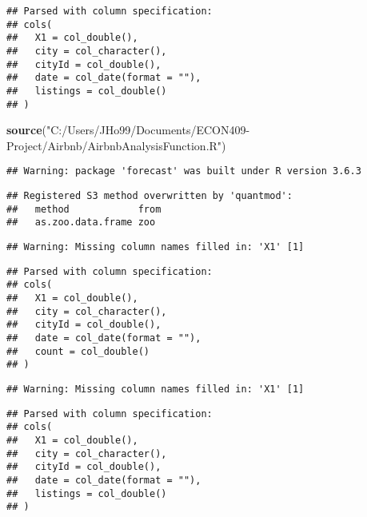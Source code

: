 \documentclass[
]{article}
\newenvironment{Shaded}{\begin{snugshade}}{\end{snugshade}}
\newcommand{\KeywordTok}[1]{\textcolor[rgb]{0.13,0.29,0.53}{\textbf{#1}}}
\newcommand{\NormalTok}[1]{#1}
\newcommand{\StringTok}[1]{\textcolor[rgb]{0.31,0.60,0.02}{#1}}
\begin{document}
\begin{verbatim}
## Parsed with column specification:
## cols(
##   X1 = col_double(),
##   city = col_character(),
##   cityId = col_double(),
##   date = col_date(format = ""),
##   listings = col_double()
## )
\end{verbatim}

\begin{Shaded}
\begin{Highlighting}[]
\KeywordTok{source}\NormalTok{(}\StringTok{"C:/Users/JHo99/Documents/ECON409-Project/Airbnb/AirbnbAnalysisFunction.R"}\NormalTok{)}
\end{Highlighting}
\end{Shaded}

\begin{verbatim}
## Warning: package 'forecast' was built under R version 3.6.3
\end{verbatim}

\begin{verbatim}
## Registered S3 method overwritten by 'quantmod':
##   method            from
##   as.zoo.data.frame zoo
\end{verbatim}

\begin{verbatim}
## Warning: Missing column names filled in: 'X1' [1]
\end{verbatim}

\begin{verbatim}
## Parsed with column specification:
## cols(
##   X1 = col_double(),
##   city = col_character(),
##   cityId = col_double(),
##   date = col_date(format = ""),
##   count = col_double()
## )
\end{verbatim}

\begin{verbatim}
## Warning: Missing column names filled in: 'X1' [1]
\end{verbatim}

\begin{verbatim}
## Parsed with column specification:
## cols(
##   X1 = col_double(),
##   city = col_character(),
##   cityId = col_double(),
##   date = col_date(format = ""),
##   listings = col_double()
## )
\end{verbatim}
\end{document}
